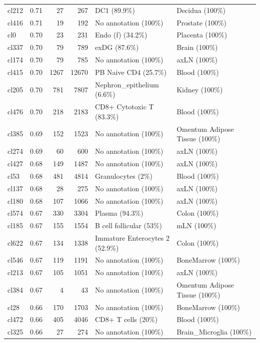 \begin{table}[ht!]
\begin{tabular}{lrrrll}
  cl212 & 0.71 &  27 & 267 & DC1 (89.9\%) & Decidua (100\%) \\ 
  cl416 & 0.71 &  19 & 192 & No annotation (100\%) & Prostate (100\%) \\ 
  cl0 & 0.70 &  23 & 231 & Endo (f) (34.2\%) & Placenta (100\%) \\ 
  cl337 & 0.70 &  79 & 789 & exDG (87.6\%) & Brain (100\%) \\ 
  cl174 & 0.70 &  79 & 785 & No annotation (100\%) & axLN (100\%) \\ 
  cl415 & 0.70 & 1267 & 12670 & PB Naive CD4  (25.7\%) & Blood (100\%) \\ 
  cl205 & 0.70 & 781 & 7807 & Nephron\_epithelium (6.6\%) & Kidney (100\%) \\ 
  cl476 & 0.70 & 218 & 2183 & CD8+ Cytotoxic T (83.3\%) & Blood (100\%) \\ 
  cl385 & 0.69 & 152 & 1523 & No annotation (100\%) & Omentum Adipose Tissue (100\%) \\ 
  cl274 & 0.69 &  60 & 600 & No annotation (100\%) & axLN (100\%) \\ 
  cl427 & 0.68 & 149 & 1487 & No annotation (100\%) & axLN (100\%) \\ 
  cl53 & 0.68 & 481 & 4814 & Granulocytes (2\%) & Blood (100\%) \\ 
  cl137 & 0.68 &  28 & 275 & No annotation (100\%) & axLN (100\%) \\ 
  cl180 & 0.68 & 107 & 1066 & No annotation (100\%) & axLN (100\%) \\ 
  cl574 & 0.67 & 330 & 3304 & Plasma (94.3\%) & Colon (100\%) \\ 
  cl185 & 0.67 & 155 & 1554 & B cell follicular (53\%) & mLN (100\%) \\ 
  cl622 & 0.67 & 134 & 1338 & \specialcell[t]{Immature Enterocytes 2\\(52.9\%)} & Colon (100\%) \\ 
  cl546 & 0.67 & 119 & 1191 & No annotation (100\%) & BoneMarrow (100\%) \\ 
  cl213 & 0.67 & 105 & 1051 & No annotation (100\%) & axLN (100\%) \\ 
  cl384 & 0.67 &   4 &  43 & No annotation (100\%) & Omentum Adipose Tissue (100\%) \\ 
  cl28 & 0.66 & 170 & 1703 & No annotation (100\%) & BoneMarrow (100\%) \\ 
  cl472 & 0.66 & 405 & 4046 & CD8+ T cells (20\%) & Blood (100\%) \\ 
  cl325 & 0.66 &  27 & 274 & No annotation (100\%) & Brain\_Microglia (100\%) \\ 

\end{tabular}
\end{table}
